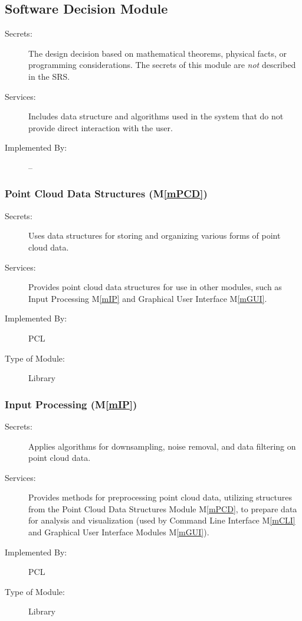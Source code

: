 \documentclass[12pt, titlepage]{article}
\newcommand{\mref}[1]{M\ref{#1}}
\begin{document}
\subsection{Software Decision Module}

\begin{description}
\item[Secrets:] The design decision based on mathematical theorems, physical
  facts, or programming considerations. The secrets of this module are
  \emph{not} described in the SRS.
\item[Services:] Includes data structure and algorithms used in the system that
  do not provide direct interaction with the user. 
\item[Implemented By:] --
\end{description}

\subsubsection{Point Cloud Data Structures (\mref{mPCD})}

\begin{description}
\item[Secrets:] Uses data structures for storing and organizing various forms of point cloud data.
\item[Services:] Provides point cloud data structures for use in other modules, such as 
  Input Processing \mref{mIP} and Graphical User Interface \mref{mGUI}.
\item[Implemented By:] PCL
\item[Type of Module:] Library
\end{description}

\subsubsection{Input Processing (\mref{mIP})}

\begin{description}
\item[Secrets:] Applies algorithms for downsampling, noise removal, and data filtering on point cloud data.
\item[Services:] Provides methods for preprocessing point cloud data, utilizing structures from the Point Cloud Data Structures Module \mref{mPCD}, 
  to prepare data for analysis and visualization (used by Command Line Interface \mref{mCLI} and Graphical User Interface Modules \mref{mGUI}).
\item[Implemented By:] PCL
\item[Type of Module:] Library
\end{description}
\end{document}
